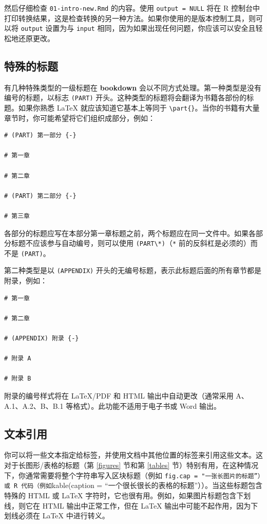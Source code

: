 \documentclass[
  12pt,
]{krantz}
\theoremstyle{definition}
\theoremstyle{definition}
\theoremstyle{definition}
\theoremstyle{definition}
\theoremstyle{remark}
\begin{document}
然后仔细检查 \texttt{01-intro-new.Rmd} 的内容。使用 \texttt{output\ =\ NULL} 将在 R 控制台中打印转换结果，这是检查转换的另一种方法。如果你使用的是版本控制工具，则可以将 \texttt{output} 设置为与 \texttt{input} 相同，因为如果出现任何问题，你应该可以安全且轻松地还原更改。

\hypertarget{ux7279ux6b8aux7684ux6807ux9898}{%
\subsection{特殊的标题}\label{ux7279ux6b8aux7684ux6807ux9898}}

有几种特殊类型的一级标题在 \textbf{bookdown} 会以不同方式处理。第一种类型是没有编号的标题，以标志 \texttt{(PART)} 开头。这种类型的标题将会翻译为书籍各部份的标题。如果你熟悉 LaTeX 就应该知道它基本上等同于 \texttt{\textbackslash{}part\{\}}。当你的书籍有大量章节时，你可能希望将它们组织成部分，例如：

\begin{verbatim}
# (PART) 第一部分 {-} 

# 第一章

# 第二章

# (PART) 第二部分 {-} 

# 第三章
\end{verbatim}

各部分的标题应写在本部分第一章标题之前，两个标题应在同一文件中。如果各部分标题不应该参与自动编号，则可以使用 \texttt{(PART\textbackslash{}*)}（\texttt{*} 前的反斜杠是必须的）而不是 \texttt{(PART)}。

第二种类型是以 \texttt{(APPENDIX)} 开头的无编号标题，表示此标题后面的所有章节都是附录，例如：

\begin{verbatim}
# 第一章

# 第二章

# (APPENDIX) 附录 {-} 

# 附录 A

# 附录 B
\end{verbatim}

附录的编号样式将在 LaTeX/PDF 和 HTML 输出中自动更改（通常采用 A、A.1、A.2、B、B.1 等格式）。此功能不适用于电子书或 Word 输出。

\hypertarget{text-references}{%
\subsection{文本引用}\label{text-references}}

你可以将一些文本指定给标签，并使用文档中其他位置的标签来引用这些文本。这对于长图形/表格的标题（第 \ref{figures} 节和第 \ref{tables} 节）特别有用，在这种情况下，你通常需要将整个字符串写入区块标题（例如 \texttt{fig.cap\ =\ "一张长图片的标题”）或\ R\ 代码（例如}kable(caption = ``一个很长很长的表格的标题''））。当这些标题包含特殊的 HTML 或 LaTeX 字符时，它也很有用。例如，如果图片标题包含下划线，则它在 HTML 输出中正常工作，但在 LaTeX 输出中可能不起作用，因为下划线必须在 LaTeX 中进行转义。
\end{document}
